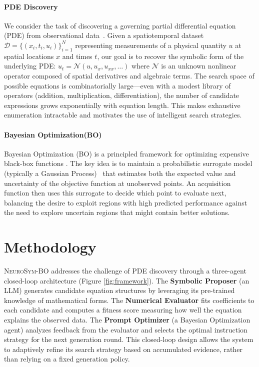 \documentclass[twoside,11pt]{article}
\newcommand{\ours}{\textsc{NeuroSym-BO}\xspace}
\let\cite\citep
\newcommand{\1}{{\bf 1}}
\newcommand{\0}{{\bf 0}}
\begin{document}
\paragraph{PDE Discovery} We consider the task of discovering a governing partial differential equation (PDE) from observational data~\cite{brunton2016sindy,rudy2017pdefind}. Given a spatiotemporal dataset $\mathcal{D} = \{(x_i, t_i, u_i)\}_{i=1}^N$ representing measurements of a physical quantity $u$ at spatial locations $x$ and times $t$, our goal is to recover the symbolic form of the underlying PDE:  $u_t = \mathcal{N}(u, u_x, u_{xx}, \ldots)$ where $\mathcal{N}$ is an unknown nonlinear operator composed of spatial derivatives and algebraic terms. The search space of possible equations is combinatorially large---even with a modest library of operators (addition, multiplication, differentiation), the number of candidate expressions grows exponentially with equation length. This makes exhaustive enumeration intractable and motivates the use of intelligent search strategies.

\paragraph{Bayesian Optimization(BO)} Bayesian Optimization (BO) is a principled framework for optimizing expensive black-box functions \cite{snoek2012practical,jones1998ego,shahriari2016taking}. The key idea is to maintain a probabilistic surrogate model (typically a Gaussian Process)~\citep{rasmussen2006gp} that estimates both the expected value and uncertainty of the objective function at unobserved points. An acquisition function then uses this surrogate to decide which point to evaluate next, balancing the desire to exploit regions with high predicted performance against the need to explore uncertain regions that might contain better solutions.



\section{Methodology}
\label{sec:method}

\ours addresses the challenge of PDE discovery through a three-agent closed-loop architecture (Figure \ref{fig:framework}). The \textbf{Symbolic Proposer} (an LLM) generates candidate equation structures by leveraging its pre-trained knowledge of mathematical forms. The \textbf{Numerical Evaluator} fits coefficients to each candidate and computes a fitness score measuring how well the equation explains the observed data. The \textbf{Prompt Optimizer} (a Bayesian Optimization agent) analyzes feedback from the evaluator and selects the optimal instruction strategy for the next generation round. This closed-loop design allows the system to adaptively refine its search strategy based on accumulated evidence, rather than relying on a fixed generation policy.
\end{document}
